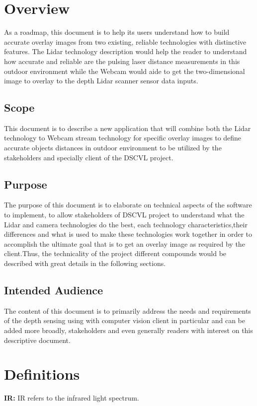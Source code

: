 
\section{Overview}
As a roadmap, this document is to help its users understand how to build accurate overlay images from two existing, reliable technologies with distinctive features. The Lidar technology description would help the reader to understand how accurate and reliable are the pulsing laser distance measurements in this outdoor environment while the Webcam would aide to get the two-dimensional image to overlay to the depth Lidar scanner sensor data inputs.
\subsection{Scope}
This document is to describe a new application that will combine both the Lidar technology to Webcam stream technology for specific overlay images to define accurate objects distances in outdoor environment to be utilized by the stakeholders  and specially client of the DSCVL project.

\subsection{Purpose}
The purpose of this document is to elaborate on technical aspects of the software to implement, to allow stakeholders of DSCVL project to understand what the Lidar and camera  technologies do the best, each technology characteristics,their differences and what is used to make these technologies work together in order to accomplish the ultimate goal that is to get an overlay image as required by the client.Thus, the technicality of the project different compounds would be described with great details  in the following sections. 

\subsection{Intended Audience}
 The content of this document is to primarily address the needs and requirements of the depth sensing using with computer vision client in particular and can be added more broadly, stakeholders  and even generally readers with interest on this descriptive document.
\section{Definitions}


		\textbf{IR: }\label{def:IR}
		IR refers to the infrared light spectrum.

